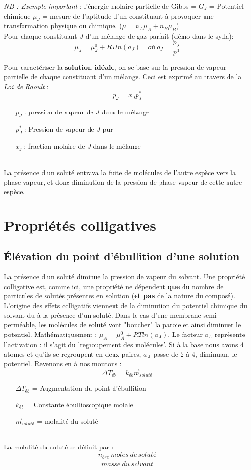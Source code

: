 \documentclass	[11pt, a4paper, openany]{book}
\begin{document}
\textit{NB : Exemple important} : l'énergie molaire partielle de Gibbs = $G_J$ = Potentiel chimique $\mu_J$ = mesure de l'aptitude d'un constituant à provoquer une transformation physique ou chimique. ($\mu = n_A \mu_A + n_B \mu_B$)\\
Pour chaque constituant $J$ d'un mélange de gaz parfait (démo dans le sylla):
$$\mu_J = \mu_J^0 + RT ln(a_J)\ \ \ \ \ où\ a_J = \frac{p_J}{p^0}$$

Pour caractériser la \textbf{solution idéale}, on se base sur la pression de vapeur partielle de chaque constituant d'un mélange. Ceci est exprimé au travers de la \textit{Loi de Raoult} :
$$p_J = x_J p_J^*$$
\begin{itemize}
	\item[$p_J$] : pression de vapeur de $J$ dans le mélange
	\item[$p^*_J$] : Pression de vapeur de $J$ pur
	\item[$x_j$] : fraction molaire de $J$ dans le mélange
\end{itemize}
\ \\ La présence d'un soluté entrava la fuite de molécules de l'autre espèce vers la phase vapeur, et donc diminution de la pression de phase vapeur de cette autre espèce.

\section{Propriétés colligatives}
\subsection{Élévation du point d'ébullition d'une solution}
La présence d'un soluté diminue la pression de vapeur du solvant. Une propriété colligative est, comme ici, une propriété ne dépendent \textbf{que} du nombre de particules de solutés présentes en solution (\textbf{et pas} de la nature du composé).\\
L'origine des effets colligatifs viennent de la diminution du potentiel chimique du solvant du à la présence d'un soluté. Dans le cas d'une membrane semi-perméable, les molécules de soluté vont "boucher" la paroie et ainsi diminuer le potentiel. Mathématiquement : $\mu_A = \mu_A^0 + RT ln(a_A)$. Le facteur $a_A$ représente l'activation : il s'agit du 'regroupement des molécules'. Si à la base nous avons 4 atomes et qu'ils se regroupent en deux paires, $a_A$ passe de 2 à 4, diminuant le potentiel. Revenons en à nos moutons : 
$$\Delta T_{éb} = k_{éb}\vec{m}_{soluté}$$
\begin{itemize}
	\item[$\Delta T_{éb}$] = Augmentation du point d'ébullition
	\item[$k_{éb}$] = Constante ébullioscopique molale
	\item[$\vec{m}_{soluté}$] = molalité du soluté
\end{itemize}
\ \\
La molalité du soluté se définit par : 
$$\frac{n_{bre}\ moles\ de\ soluté}{masse\ du\ solvant}$$
\end{document}
